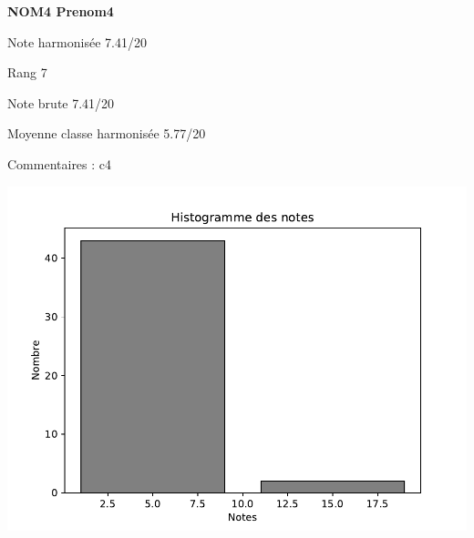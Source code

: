 \begin{minipage}[c]{.45\linewidth} 
\Large \textbf{\textsf{NOM4 Prenom4}} 
 
 \normalsize Note harmonisée 7.41/20 
 
Rang 7
 
Note brute 7.41/20 
 
Moyenne classe harmonisée 5.77/20 
 
Commentaires : 
c4 
\end{minipage}\hfill 
\begin{minipage}[c]{.45\linewidth}  
\begin{center}
\includegraphics[width=.8\linewidth]{../histo.pdf} 
\end{center}
\end{minipage}
\footnotesize 
